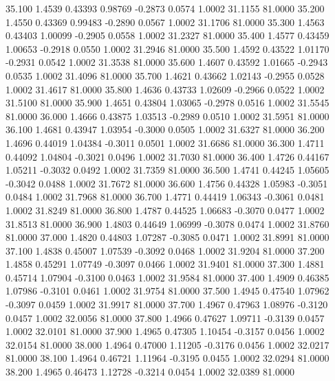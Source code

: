   35.100   1.4539   0.43393   0.98769  -0.2873   0.0574   1.0002  31.1155  81.0000
  35.200   1.4550   0.43369   0.99483  -0.2890   0.0567   1.0002  31.1706  81.0000
  35.300   1.4563   0.43403   1.00099  -0.2905   0.0558   1.0002  31.2327  81.0000
  35.400   1.4577   0.43459   1.00653  -0.2918   0.0550   1.0002  31.2946  81.0000
  35.500   1.4592   0.43522   1.01170  -0.2931   0.0542   1.0002  31.3538  81.0000
  35.600   1.4607   0.43592   1.01665  -0.2943   0.0535   1.0002  31.4096  81.0000
  35.700   1.4621   0.43662   1.02143  -0.2955   0.0528   1.0002  31.4617  81.0000
  35.800   1.4636   0.43733   1.02609  -0.2966   0.0522   1.0002  31.5100  81.0000
  35.900   1.4651   0.43804   1.03065  -0.2978   0.0516   1.0002  31.5545  81.0000
  36.000   1.4666   0.43875   1.03513  -0.2989   0.0510   1.0002  31.5951  81.0000
  36.100   1.4681   0.43947   1.03954  -0.3000   0.0505   1.0002  31.6327  81.0000
  36.200   1.4696   0.44019   1.04384  -0.3011   0.0501   1.0002  31.6686  81.0000
  36.300   1.4711   0.44092   1.04804  -0.3021   0.0496   1.0002  31.7030  81.0000
  36.400   1.4726   0.44167   1.05211  -0.3032   0.0492   1.0002  31.7359  81.0000
  36.500   1.4741   0.44245   1.05605  -0.3042   0.0488   1.0002  31.7672  81.0000
  36.600   1.4756   0.44328   1.05983  -0.3051   0.0484   1.0002  31.7968  81.0000
  36.700   1.4771   0.44419   1.06343  -0.3061   0.0481   1.0002  31.8249  81.0000
  36.800   1.4787   0.44525   1.06683  -0.3070   0.0477   1.0002  31.8513  81.0000
  36.900   1.4803   0.44649   1.06999  -0.3078   0.0474   1.0002  31.8760  81.0000
  37.000   1.4820   0.44803   1.07287  -0.3085   0.0471   1.0002  31.8991  81.0000
  37.100   1.4838   0.45007   1.07539  -0.3092   0.0468   1.0002  31.9204  81.0000
  37.200   1.4858   0.45291   1.07749  -0.3097   0.0466   1.0002  31.9401  81.0000
  37.300   1.4881   0.45714   1.07904  -0.3100   0.0463   1.0002  31.9584  81.0000
  37.400   1.4909   0.46385   1.07986  -0.3101   0.0461   1.0002  31.9754  81.0000
  37.500   1.4945   0.47540   1.07962  -0.3097   0.0459   1.0002  31.9917  81.0000
  37.700   1.4967   0.47963   1.08976  -0.3120   0.0457   1.0002  32.0056  81.0000
  37.800   1.4966   0.47627   1.09711  -0.3139   0.0457   1.0002  32.0101  81.0000
  37.900   1.4965   0.47305   1.10454  -0.3157   0.0456   1.0002  32.0154  81.0000
  38.000   1.4964   0.47000   1.11205  -0.3176   0.0456   1.0002  32.0217  81.0000
  38.100   1.4964   0.46721   1.11964  -0.3195   0.0455   1.0002  32.0294  81.0000
  38.200   1.4965   0.46473   1.12728  -0.3214   0.0454   1.0002  32.0389  81.0000
